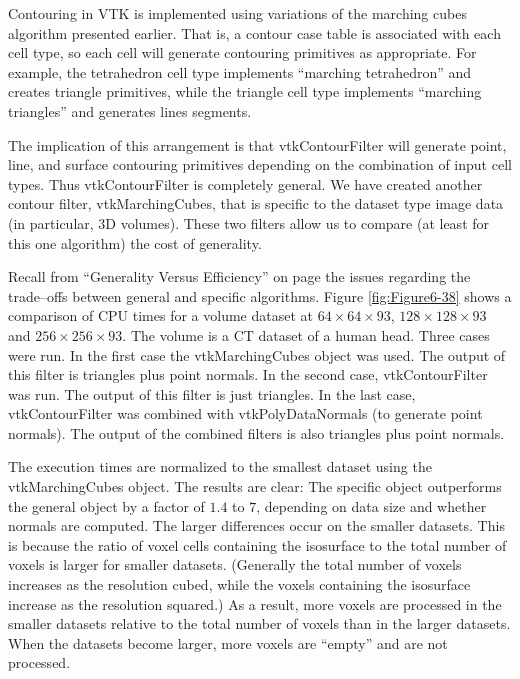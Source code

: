 Contouring in VTK is implemented using variations of the marching cubes algorithm presented earlier. That is, a contour case table is associated with each cell type, so each cell will generate contouring primitives as appropriate. For example, the tetrahedron cell type implements ``marching tetrahedron'' and creates triangle primitives, while the triangle cell type implements ``marching triangles'' and generates lines segments.

The implication of this arrangement is that vtkContourFilter will generate point, line, and surface contouring primitives depending on the combination of input cell types. Thus vtkContourFilter is completely general. We have created another contour filter, vtkMarchingCubes, that is specific to the dataset type image data (in particular, 3D volumes). These two filters allow us to compare (at least for this one algorithm) the cost of generality.

Recall from ``Generality Versus Efficiency'' on page \pageref{subsec:benerality_vs_efficiency} the issues regarding the trade--offs between general and specific algorithms. Figure \ref{fig:Figure6-38} shows a comparison of CPU times for a volume dataset at $64 \times 64\times 93$, $128 \times 128\times 93$ and $256 \times 256\times 93$. The volume is a CT dataset of a human head. Three cases were run. In the first case the  vtkMarchingCubes object was used. The output of this filter is triangles plus point normals. In the second case, vtkContourFilter was run. The output of this filter is just triangles. In the last case, vtkContourFilter was combined with vtkPolyDataNormals (to generate point normals). The output of the combined filters is also triangles plus point normals.

The execution times are normalized to the smallest dataset using the vtkMarchingCubes object. The results are clear: The specific object outperforms the general object by a factor of $1.4$ to $7$, depending on data size and whether normals are computed. The larger differences occur on the smaller datasets. This is because the ratio of voxel cells containing the isosurface to the total number of voxels is larger for smaller datasets. (Generally the total number of voxels increases as the resolution cubed, while the voxels containing the isosurface increase as the resolution squared.) As a result, more voxels are processed in the smaller datasets relative to the total number of voxels than in the larger datasets. When the datasets become larger, more voxels are ``empty'' and are not processed.

